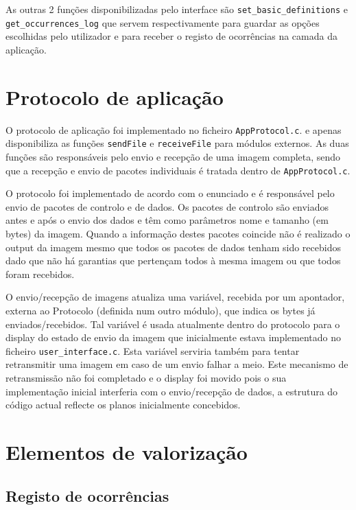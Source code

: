 \documentclass[11pt,a4paper,reqno]{report}
\numberwithin{equation}{section}
\begin{document}
As outras 2 funções disponibilizadas pelo interface são \verb|set_basic_definitions| e \verb|get_occurrences_log| que servem respectivamente para guardar as opções escolhidas pelo utilizador e para receber o registo de ocorrências na camada da aplicação.


\chapter{Protocolo de aplicação}

O protocolo de aplicação foi implementado no ficheiro \verb|AppProtocol.c|. e apenas disponibiliza as funções \verb|sendFile| e \verb|receiveFile| para módulos externos. As duas funções são responsáveis pelo envio e recepção de uma imagem completa, sendo que a recepção e envio de pacotes individuais é tratada dentro de \verb|AppProtocol.c|.

O protocolo foi implementado de acordo com o enunciado e é responsável pelo envio de pacotes de controlo e de dados.
Os pacotes de controlo são enviados antes e após o envio dos dados e têm como parâmetros  nome e tamanho (em bytes) da imagem.
Quando a informação destes pacotes coincide não é realizado o output da imagem mesmo que todos os pacotes de dados tenham sido recebidos dado que não há garantias que pertençam  todos à mesma imagem ou que todos foram recebidos.

O envio/recepção de imagens atualiza uma variável, recebida por um apontador, externa ao Protocolo (definida num outro módulo), que indica os bytes já enviados/recebidos. Tal variável é usada atualmente dentro do protocolo para o display do estado de envio da imagem que inicialmente estava implementado no ficheiro \verb|user_interface.c|. Esta variável serviria também para tentar retransmitir uma imagem em caso de um envio falhar a meio. Este mecanismo de retransmissão não foi completado e o display foi movido pois o sua implementação inicial interferia com o envio/recepção de dados, a estrutura do código actual reflecte os planos inicialmente concebidos.

\chapter{Elementos de valorização}

\section{Registo de ocorrências}
\end{document}
